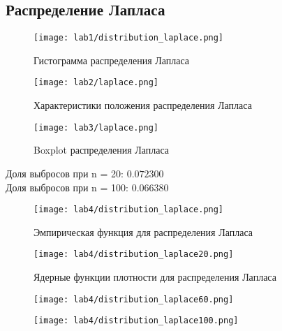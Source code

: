 \documentclass[a4]{article}
\begin{document}
\subsection{Распределение Лапласа}
	\begin{figure}[H]
	\caption{Гистограмма распределения Лапласа}
	\texttt{[image: lab1/distribution\_laplace.png]}
	\end{figure}
	\begin{figure}[H]
	\caption{Характеристики положения распределения Лапласа}
	\texttt{[image: lab2/laplace.png]}
	\end{figure}
	\begin{figure}[H]
	\caption{Boxplot распределения Лапласа }
	\texttt{[image: lab3/laplace.png]}
	\end{figure}
	Доля выбросов при n = 20: $0.072300$\\
	Доля выбросов при n = 100: $0.066380$
	\begin{figure}[H]
	\caption{Эмпирическая функция для распределения Лапласа}
	\texttt{[image: lab4/distribution\_laplace.png]}
	\end{figure}
	\begin{figure}[H]
	\caption{Ядерные функции плотности для распределения Лапласа}
	\texttt{[image: lab4/distribution\_laplace20.png]}
	\end{figure}
	\begin{figure}[H]
	\texttt{[image: lab4/distribution\_laplace60.png]}
	\end{figure}
	\begin{figure}[H]
	\texttt{[image: lab4/distribution\_laplace100.png]}
	\end{figure}
\newpage
\end{document}
